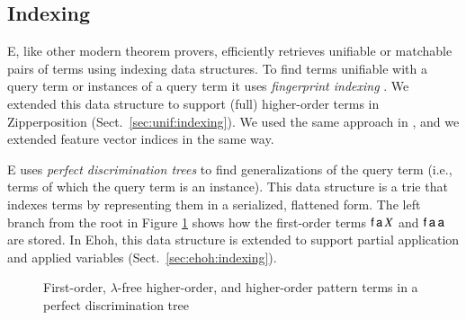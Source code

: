 \subsection{Indexing} E, like other modern theorem provers, efficiently retrieves
unifiable or matchable pairs of terms using indexing data structures. To find
terms unifiable with a query term or instances of a query term it uses
\emph{fingerprint indexing} \cite{ss-12-fp-indexing}. We extended this data
structure to support (full) higher-order terms in Zipperposition (Sect.~\ref{sec:unif:indexing}). 
We used the same approach in \ehohii{},
and we extended feature vector indices \cite{ss-2013-feature-vector}
in the same way.

E uses \emph{perfect discrimination trees} \cite{mcc-92-pdts} to find
generalizations of the query term (i.e., terms of which the query term is an instance).
This data structure is a trie
that indexes terms by representing them in a serialized, flattened form.
The left branch from the root in Figure \ref{fig:pdt} shows how the first-order terms
$\mathsf{f}\, \mathsf{a} \, X$ and $\mathsf{f}\, \mathsf{a} \, \mathsf{a}$ are stored.
In Ehoh, this data structure is extended to support partial application
and applied variables (Sect.~\ref{sec:ehoh:indexing}).

\begin{figure}[tb]
\centering
{}
\caption{First-order, $\lambda$-free higher-order, and higher-order pattern
  terms in a perfect discrimination tree}
\label{fig:pdt}
\end{figure}

